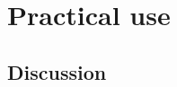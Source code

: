 \section{Practical use}

\subsection{Discussion}

\begin{comment}
this is chapter eight devoted to applicative hunters and pro functors
the first part will be practical examples main motivation for applicati
factors comes from considering kinetic computations or computations
in the factor block as I color in case when effects are independent
and competitive or in case when these effects could be executed in
parallel while the result is still correct here is an example consider
a portion of a functor block or a for yield block in Scala that looks
like this there are three future values and X will be waiting until
with this future value is ready imagine that these are some long-running
computations and after these three lines we can use XYZ and further
computations any further computations will be waiting for these three
futures now if we write code like this then these three futures will
be created sequentially that is first this future will be created
and scheduled on some thread and then when it's done you get the value
X and then this second future will be created and scheduled even though
it doesn't use the value X but the monadic block or the for yield
block or the Thunder block whatever you want to call it I call it
a factor block the Thunder block is such that every generator line
locks everything else until it's done so in the future we'll be created
one at a time and so obviously this is not optimal if you translate
this into flat map code and map that's the code so you have a first
future but to which you append this flat map so you schedule it is
further computation only when the first computation is ready the second
future will be then started and this will be waiting until the second
future is ready and then the third future will be started and this
will be ready will be waiting until the third future is ready clearly
this is not optimal would like to parallelize these things and we
have seen in a previous tutorial that a very easy way of paralyzing
such computations is to create the futures before starting the factor
block but this is actually a specific feature of scholar where futures
already start computing when you create them there is no separate

\end{comment}
